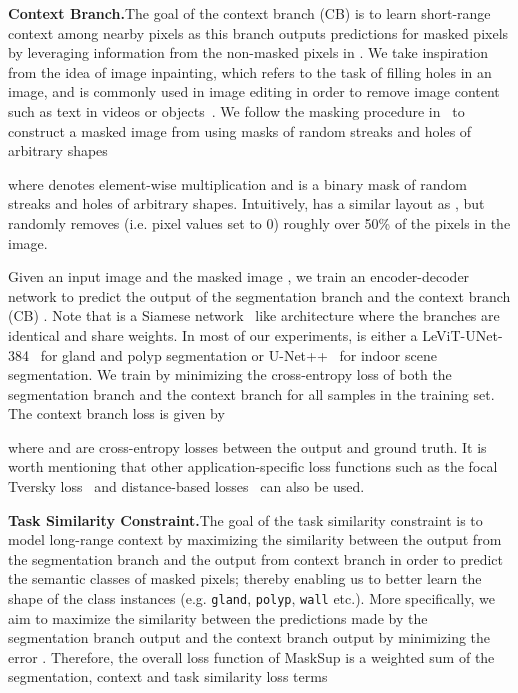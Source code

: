 \documentclass{bmvc2k}
\begin{document}
\medskip\noindent\textbf{Context Branch.}\quad The goal of the context branch (CB) is to learn short-range context among nearby pixels as this branch outputs predictions for masked pixels by leveraging information from the non-masked pixels in . We take inspiration from the idea of image inpainting, which refers to the task of filling holes in an image, and is commonly used in image editing in order to remove image content such as text in videos or objects~\cite{liu2018image,suvorov2022resolution}. We follow the masking procedure in~\cite{liu2018image} to construct a masked image  from  using masks of random streaks and holes of arbitrary shapes

where  denotes element-wise multiplication and  is a binary mask of random streaks and holes of arbitrary shapes. Intuitively,  has a similar layout as , but randomly removes (i.e. pixel values set to 0) roughly over 50\% of the pixels in the image.


Given an input image  and the masked image , we train an encoder-decoder network  to predict the output of the segmentation branch  and the context branch (CB) . Note that  is a Siamese network~\cite{bromley1993signature} like architecture where the branches are identical and share weights. In most of our experiments,  is either a LeViT-UNet-384~\cite{xu2021levit} for gland and polyp segmentation or U-Net++~\cite{zhou2019unet++} for indoor scene segmentation. We train  by minimizing the cross-entropy loss of both the segmentation branch and the context branch for all samples in the training set. The context branch loss is given by

where  and  are cross-entropy losses between the output and ground truth. It is worth mentioning that other application-specific loss functions such as the focal Tversky loss~\cite{abraham2019novel} and distance-based losses~\cite{karimi2019reducing, caliva2019distance} can also be used.

\medskip\noindent\textbf{Task Similarity Constraint.}\quad The goal of the task similarity constraint is to model long-range context by maximizing the similarity between the output from the segmentation branch and the output from context branch in order to predict the semantic classes of masked pixels; thereby enabling us to better learn the shape of the class instances (e.g. \texttt{gland}, \texttt{polyp}, \texttt{wall} etc.). More specifically, we aim to maximize the similarity between the predictions made by the segmentation branch output  and the context branch output  by minimizing the  error . Therefore, the overall loss function of MaskSup is a weighted sum of the segmentation, context and task similarity loss terms
\end{document}

